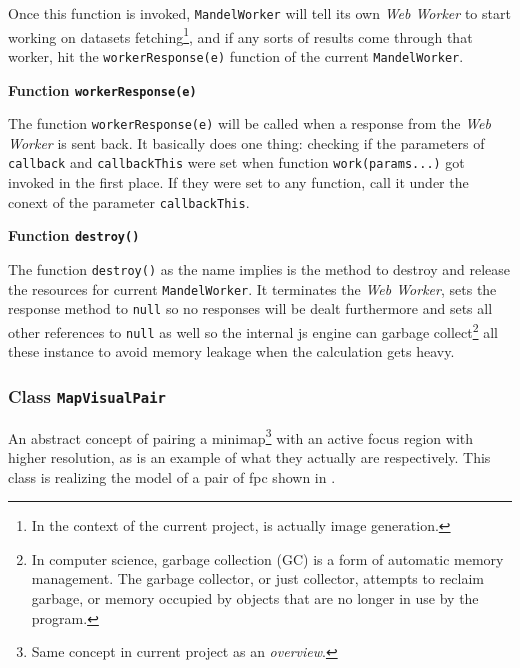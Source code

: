 Once this function is invoked, \texttt{MandelWorker} will tell its own \emph{Web Worker} to start working on datasets fetching\footnote{ In the context of the current project, is actually image generation. }, and if any sorts of results come through that worker, hit the \texttt{workerResponse(e)} function of the current \texttt{MandelWorker}.

\textbf{Function \texttt{workerResponse(e)}}

The function \texttt{workerResponse(e)} will be called when a response from the \emph{Web Worker} is sent back. It basically does one thing: checking if the parameters of \texttt{callback} and \texttt{callbackThis} were set when function \texttt{work(params...)} got invoked in the first place. If they were set to any function, call it under the conext of the parameter \texttt{callbackThis}.

\textbf{Function \texttt{destroy()}}

The function \texttt{destroy()} as the name implies is the method to destroy and release the resources for current \texttt{MandelWorker}. It terminates the \emph{Web Worker}, sets the response method to \texttt{null} so no responses will be dealt furthermore and sets all other references to \texttt{null} as well so the internal \gls{js} engine can garbage collect\footnote{ In computer science, garbage collection (GC) is a form of automatic memory management. The garbage collector, or just collector, attempts to reclaim garbage, or memory occupied by objects that are no longer in use by the program\cite{wiki:gc}.} all these instance to avoid memory leakage when the calculation gets heavy.

\subsubsection{Class \texttt{MapVisualPair}}

An abstract concept of pairing a minimap\footnote{ Same concept in current project as an \emph{overview}. } with an active focus region with higher resolution, as  is an example of what they actually are respectively. This class is realizing the model of a pair of \gls{fpc} shown in .

